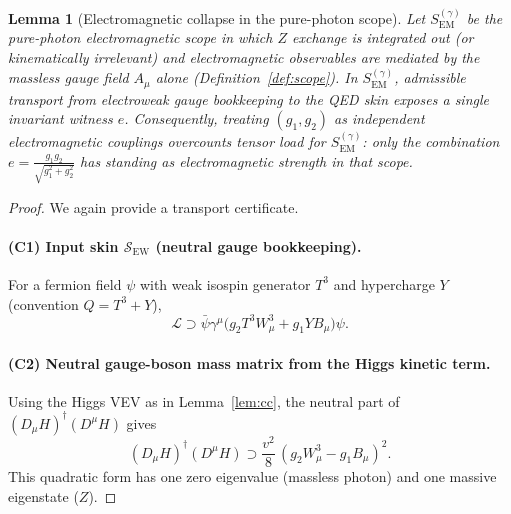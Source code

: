 \documentclass[11pt]{article}
\newtheorem{lemma}[definition]{Lemma}
\theoremstyle{remark}
\newcommand{\EM}{\ensuremath{\mathrm{EM}}}
\newcommand{\Skin}{\mathcal{S}}
\begin{document}
\begin{lemma}[Electromagnetic collapse in the pure-photon scope]\label{lem:em}
Let $S_{\EM}^{(\gamma)}$ be the \emph{pure-photon electromagnetic scope} in which $Z$ exchange is
integrated out (or kinematically irrelevant) and electromagnetic observables are mediated by the
massless gauge field $A_\mu$ alone (Definition~\ref{def:scope}).
In $S_{\EM}^{(\gamma)}$, admissible transport from electroweak gauge bookkeeping to the QED skin
exposes a single invariant witness $e$. Consequently, treating $(g_1,g_2)$ as independent
\emph{electromagnetic} couplings overcounts tensor load for $S_{\EM}^{(\gamma)}$:
only the combination $e=\frac{g_1 g_2}{\sqrt{g_1^2+g_2^2}}$ has standing as electromagnetic strength in
that scope.
\end{lemma}

\begin{proof}
We again provide a transport certificate.

\paragraph{(C1) Input skin $\Skin_{\mathrm{EW}}$ (neutral gauge bookkeeping).}
For a fermion field $\psi$ with weak isospin generator $T^3$ and hypercharge $Y$ (convention
$Q=T^3+Y$),
\begin{equation}\label{eq:neutral-coupling}
\mathcal{L}\supset
\bar\psi\gamma^\mu\big(g_2 T^3 W^3_\mu + g_1 Y B_\mu\big)\psi.
\end{equation}

\paragraph{(C2) Neutral gauge-boson mass matrix from the Higgs kinetic term.}
Using the Higgs VEV as in Lemma~\ref{lem:cc}, the neutral part of $(D_\mu H)^\dagger(D^\mu H)$ gives
\begin{equation}\label{eq:neutral-mass}
(D_\mu H)^\dagger(D^\mu H)\supset \frac{v^2}{8}\,(g_2 W^3_\mu - g_1 B_\mu)^2.
\end{equation}
This quadratic form has one zero eigenvalue (massless photon) and one massive eigenstate ($Z$).


\end{proof}
\end{document}

